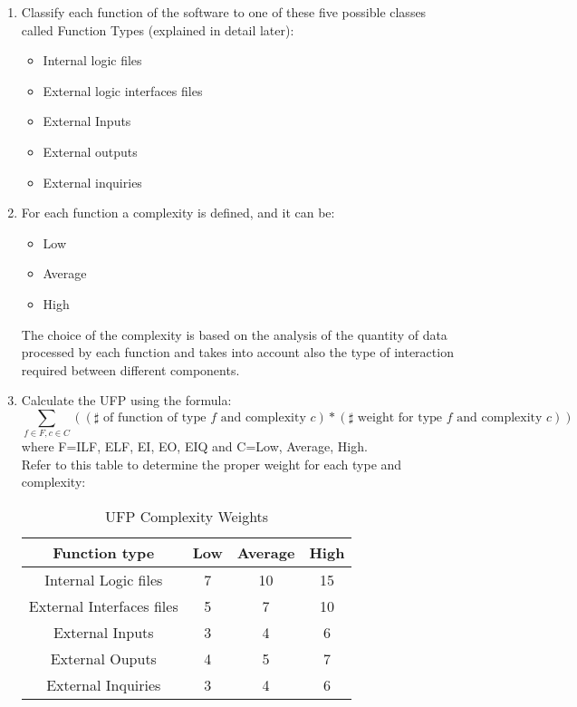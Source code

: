 \begin{enumerate}
\item Classify each function of the software to one of these five possible classes called Function Types (explained in detail later):
\begin{itemize}
\item Internal logic files
\item External logic interfaces files
\item External Inputs
\item External outputs
\item External inquiries
\end{itemize}
\item For each function a complexity is defined, and it can be:
\begin{itemize}
\item Low
\item Average
\item High
\end{itemize}
The choice of the complexity is based on the analysis of the quantity of data processed by each function and takes into account also the type of interaction required between different components.
\item Calculate the UFP using the formula:
\[ \sum_{f\in F, c\in C} ((\sharp \text{ of function of type } f \text{ and complexity }c)*(\sharp \text{ weight for type } f \text{ and complexity }c)) \]
where F={ILF, ELF, EI, EO, EIQ} and C={Low, Average, High}. \\
Refer to this table to determine the proper weight for each type and complexity:
\begin{table}[!h]
\centering
\caption{UFP Complexity Weights}
\label{ufp-complex}
\begin{tabular}{cccc}
\hline
Function type             & Low & Average & High \\ \hline
Internal Logic files      & 7   & 10      & 15 \\
External Interfaces files & 5   & 7       & 10 \\
External Inputs           & 3   & 4       & 6  \\
External Ouputs           & 4   & 5       & 7  \\
External Inquiries        & 3   & 4       & 6  \\ \hline
\end{tabular}
\end{table}
\end{enumerate}


